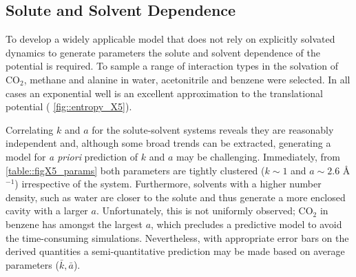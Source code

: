 \documentclass[../main.tex]{subfiles}
\begin{document}
\subsection{Solute and Solvent Dependence}

To develop a  widely applicable model that does not rely on explicitly solvated dynamics to generate parameters the solute and solvent dependence of the potential is required. To sample a range of interaction types in the solvation of CO$_2$, methane and alanine in water, acetonitrile and benzene were selected. In all cases an exponential well is an excellent approximation to the translational potential (\figurename{ \ref{fig::entropy_X5}}). 

Correlating $k$ and $a$ for the solute-solvent systems reveals they are reasonably independent and, although some broad trends can be extracted, generating a model for \emph{a priori} prediction of $k$ and $a$ may be challenging. Immediately, from \tablename{ \ref{table::figX5_params}} both parameters are tightly clustered ($k \sim 1$ \kcal and $a \sim 2.6 $ \AA$^{-1}$) irrespective of the system. Furthermore, solvents with a higher number density, such as water are  closer to the solute and thus generate a more enclosed cavity with a larger $a$. Unfortunately, this is not uniformly observed; CO$_2$ in benzene has amongst the largest $a$, which precludes a predictive model to avoid the time-consuming simulations. Nevertheless, with appropriate error bars on the derived quantities a semi-quantitative prediction may be made based on average parameters ($\bar{k}, \bar{a}$). 
\end{document}
